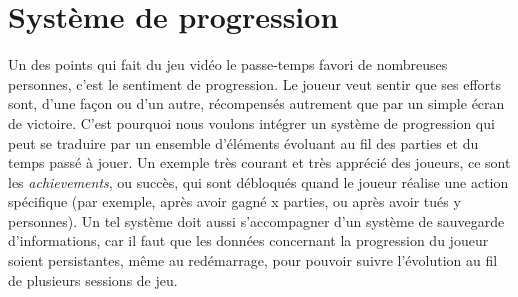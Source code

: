 \documentclass[../doc.tex]{subfiles}
\begin{document}
\section{Système de progression}
Un des points qui fait du jeu vidéo le passe-temps
favori de nombreuses personnes, c'est le sentiment de
progression. Le joueur veut sentir que ses efforts sont,
d'une façon ou d'un autre, récompensés autrement que par un
simple écran de victoire. C'est pourquoi nous voulons intégrer
un système de progression qui peut se traduire par un ensemble
d'éléments évoluant au fil des parties et du temps passé à jouer.
\newline\indent
Un exemple très courant et très apprécié des joueurs, ce sont les
\textit{achievements}, ou succès, qui sont débloqués quand le joueur réalise
une action spécifique (par exemple, après avoir gagné x parties,
ou après avoir tués y personnes). Un tel système doit aussi s'accompagner d'un système de sauvegarde d'informations,
car il faut que les données concernant la progression du joueur
soient persistantes, même au redémarrage, pour pouvoir suivre l'évolution au fil de plusieurs sessions de jeu.
\end{document}
